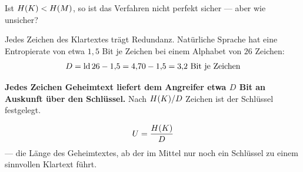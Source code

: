 \begin{merksatz}
Ist $H(K) < H(M)$, so ist das Verfahren nicht perfekt sicher --- aber wie unsicher?

Jedes Zeichen des Klartextes trägt Redundanz. Natürliche Sprache hat eine Entropierate von etwa $1{,}5$ Bit je Zeichen bei einem Alphabet von $26$ Zeichen:
\[ D = \operatorname{ld} 26 - 1{,}5 = 4{,}70 - 1{,}5 = 3{,}2 \ \text{Bit je Zeichen} \]

\begin{center}
\begin{minipage}{0.9\textwidth}
\textbf{Jedes Zeichen Geheimtext liefert dem Angreifer etwa $D$ Bit an Auskunft über den Schlüssel.} Nach $H(K)/D$ Zeichen ist der Schlüssel festgelegt.
\end{minipage}
\end{center}
\end{merksatz}

\begin{definition}
\[ U = \frac{H(K)}{D} \]
--- die Länge des Geheimtextes, ab der im Mittel nur noch ein Schlüssel zu einem sinnvollen Klartext führt.
\end{definition}

